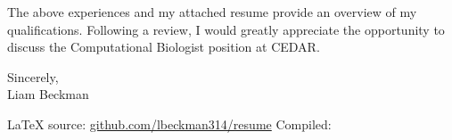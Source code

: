 \vspace*{\baselineskip}

The above experiences and my attached resume provide an overview of my qualifications. Following a review, I would greatly appreciate the opportunity to discuss the Computational Biologist position at CEDAR.

\vspace*{2\baselineskip}

Sincerely,\\

Liam Beckman

\vfill \myBreak{}
\textcolor{my-red}{\LaTeX{} source:} \textcolor{my-blue}{\href{https://github.com/lbeckman314/resume}{github.com/lbeckman314/resume}}
\hfill
\textcolor{my-red}{Compiled:} \textcolor{my-blue}{\href{https://liambeckman.com/jenkins/job/resume/}{\DTMtoday}}

